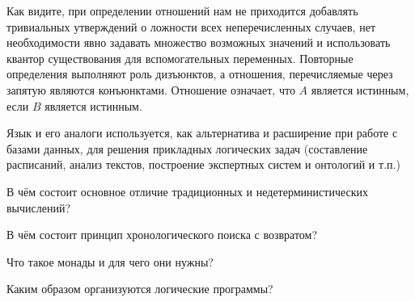 Как видите, при определении отношений нам не приходится добавлять тривиальных утверждений о ложности всех неперечисленных случаев, нет необходимости явно задавать множество возможных значений и использовать квантор существования для вспомогательных переменных. Повторные определения выполняют роль дизъюнктов, а отношения, перечисляемые через запятую являются конъюнктами. Отношение   означает, что $A$ является истинным, если $B$ является истинным.

Язык  и его аналоги используется, как альтернатива и расширение  при работе с базами данных, для решения прикладных логических задач (составление расписаний, анализ текстов, построение экспертных систем и онтологий и т.п.)

\begin{Queeze}
 \item В чём состоит основное отличие традиционных и недетерминистических вычислений?
 \item В чём состоит принцип хронологического поиска с возвратом?
 \item Что такое монады и для чего они нужны? 
 \item Каким образом организуются логические программы?
\end{Queeze}
